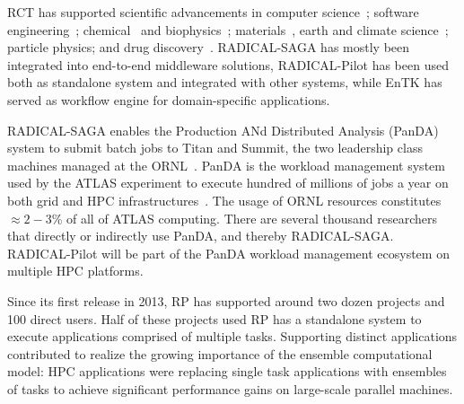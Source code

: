 \documentclass[preprint,12pt, a4paper]{elsarticle}
\begin{document}

RCT has supported scientific advancements in computer
science~\cite{merzky2018synapse}; software
engineering~\cite{turilli2019middleware}; chemical~\cite{sampat2018parallel} and
biophysics~\cite{shkurti2016coco,dakka2018high}; materials~\cite{dakka2018high},
earth and climate
science~\cite{paraskevakos2019workflow,balasubramanian2018harnessing}; particle
physics\cite{oleynik2017high}; and drug discovery~\cite{bfe-jctc-2014}.
RADICAL-SAGA has mostly been integrated into end-to-end middleware solutions,
RADICAL-Pilot has been used both as standalone system and integrated with other
systems, while EnTK has served as workflow engine for domain-specific
applications.

RADICAL-SAGA enables the Production ANd Distributed Analysis (PanDA) system to
submit batch jobs to Titan and Summit, the two leadership class machines
managed at the ORNL~\cite{web-olcf-resources}. PanDA is the workload
management system used by the ATLAS experiment to execute hundred of millions
of jobs a year on both grid and HPC infrastructures~\cite{maeno2008panda}. The
usage of ORNL resources constitutes $\approx 2-3$\% of all of ATLAS computing.
There are several thousand researchers that directly or indirectly use PanDA,
and thereby RADICAL-SAGA. RADICAL-Pilot will be part of the PanDA workload
management ecosystem on multiple HPC platforms.



Since its first release in 2013, RP has supported around two dozen projects
and 100 direct users. Half of these projects used RP has a standalone system
to execute applications comprised of multiple tasks. Supporting distinct
applications contributed to realize the growing importance of the
ensemble computational model: HPC applications were replacing single task
applications with ensembles of tasks to achieve significant performance gains
on large-scale parallel machines.
\end{document}
